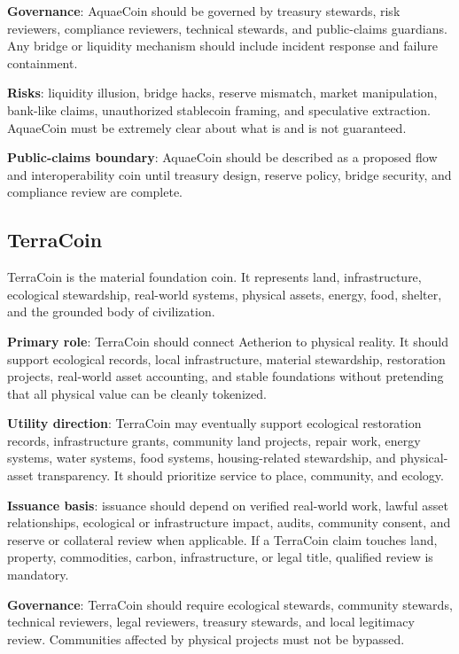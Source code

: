 \documentclass[12pt]{article}
\begin{document}
\textbf{Governance}: AquaeCoin should be governed by treasury stewards, risk reviewers, compliance reviewers, technical stewards, and public-claims guardians. Any bridge or liquidity mechanism should include incident response and failure containment.

\textbf{Risks}: liquidity illusion, bridge hacks, reserve mismatch, market manipulation, bank-like claims, unauthorized stablecoin framing, and speculative extraction. AquaeCoin must be extremely clear about what is and is not guaranteed.

\textbf{Public-claims boundary}: AquaeCoin should be described as a proposed flow and interoperability coin until treasury design, reserve policy, bridge security, and compliance review are complete.

\subsection{TerraCoin}

TerraCoin is the material foundation coin. It represents land, infrastructure, ecological stewardship, real-world systems, physical assets, energy, food, shelter, and the grounded body of civilization.

\textbf{Primary role}: TerraCoin should connect Aetherion to physical reality. It should support ecological records, local infrastructure, material stewardship, restoration projects, real-world asset accounting, and stable foundations without pretending that all physical value can be cleanly tokenized.

\textbf{Utility direction}: TerraCoin may eventually support ecological restoration records, infrastructure grants, community land projects, repair work, energy systems, water systems, food systems, housing-related stewardship, and physical-asset transparency. It should prioritize service to place, community, and ecology.

\textbf{Issuance basis}: issuance should depend on verified real-world work, lawful asset relationships, ecological or infrastructure impact, audits, community consent, and reserve or collateral review when applicable. If a TerraCoin claim touches land, property, commodities, carbon, infrastructure, or legal title, qualified review is mandatory.

\textbf{Governance}: TerraCoin should require ecological stewards, community stewards, technical reviewers, legal reviewers, treasury stewards, and local legitimacy review. Communities affected by physical projects must not be bypassed.
\end{document}
